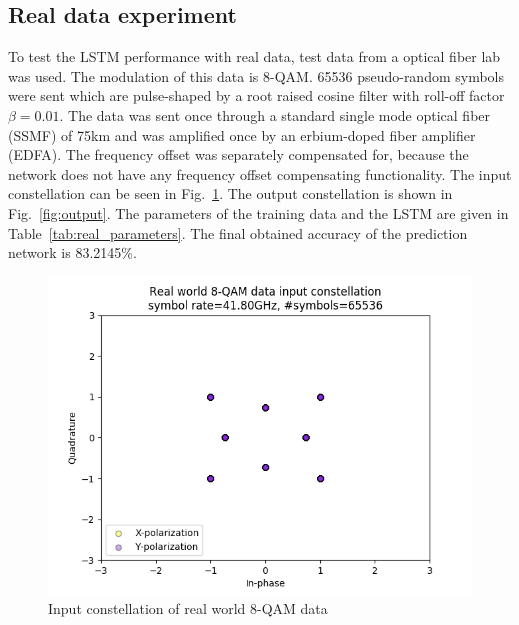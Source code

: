 \documentclass[journal,10pt,twoside, a4paper]{IEEEtran}
\begin{document}
\subsection{Real data experiment}
To test the LSTM performance with real data, test data from a optical fiber lab was used. The modulation of this data is 8-QAM. 65536 pseudo-random symbols were sent which are pulse-shaped by a root raised cosine filter with roll-off factor $\beta=0.01$. The data was sent once through a standard single mode optical fiber (SSMF) of 75km and was amplified once by an erbium-doped fiber amplifier (EDFA). The frequency offset was separately compensated for, because the network does not have any frequency offset compensating functionality. The input constellation can be seen in Fig.~\ref{fig:input}. The output constellation is shown in Fig.~\ref{fig:output}. The parameters of the training data and the LSTM are given in Table~\ref{tab:real_parameters}. The final obtained accuracy of the prediction network is 83.2145\%.

\begin{figure}
    \centering
    \includegraphics[width=\linewidth]{Thesis/images/real_input.png}
    \caption{Input constellation of real world 8-QAM data}
    \label{fig:input}
\end{figure}
\end{document}
